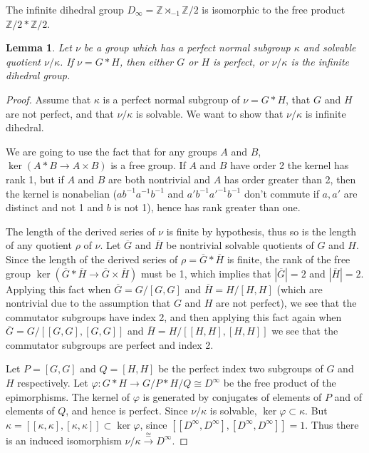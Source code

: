 \documentclass[12pt]{amsart}
\newtheorem{lemma}[theorem]{Lemma}
\theoremstyle{definition}
\newcommand{\Z}{\mathbb Z}
\newcommand{\ol}[1]{{\overline{#1}}}
\begin{document}
The infinite dihedral group $D_\infty = \Z \rtimes_{-1} \Z/2$ is isomorphic to the free product $\Z/2 * \Z/2$.

\begin{lemma}
\label{free product}
Let $\nu$ be a group which has a perfect normal subgroup $\kappa$
and solvable quotient $\nu/\kappa$.
If $\nu ={G*H}$, then either $G$ or $H$ is perfect, or $\nu/\kappa$ is the infinite dihedral group.

\end{lemma}

\begin{proof} Assume that $\kappa$ is a perfect normal subgroup of $\nu = G * H$,  that $G$ and $H$ are not perfect, and that $\nu/\kappa$ is solvable.   We want to show that $\nu/\kappa$ is infinite dihedral.

We are going to use the fact \cite[Proposition 1.4.6]{DD89} that  for any groups $A$ and $B$,  $\ker(A * B \to A \times B)$ is a  free group.   If $A$ and $B$ have order 2  the kernel has rank 1, but if $A$ and $B$ are both nontrivial and $A$ has order greater than 2, then the kernel is nonabelian ($ab^{-1}a^{-1}b^{-1}$ and $a'b^{-1}a'^{-1}b^{-1}$ don't commute if $a,a'$ are distinct and not  1 and $b$ is not  1), hence has rank greater than one.

The length of the derived series of $\nu$ is finite by hypothesis, thus so is the length of any quotient $\rho$ of $\nu$.   Let $\ol G$ and $\ol H$ be nontrivial solvable quotients of $G$ and $H$.    Since the length of the derived series of  $\rho = \ol G *\ol H$ is finite, the rank of the free group  $\ker(\ol G * \ol H \to \ol G \times \ol H)$ must be 1, which implies that  $|\ol G| =2$ and $|\ol H| = 2$.  Applying this fact when $\ol G = G/[G,G]$ and $\ol H = H/[H,H]$ (which are nontrivial due to the assumption that $G$ and $H$ are not perfect), we see that the commutator subgroups have index 2, and then applying this fact again when $\ol G = G/[[G,G],[G,G]]$ and  $\ol H = H/[[H,H],[H,H]]$ we see that the commutator subgroups are perfect and index 2.

Let $P = [G,G]$ and $Q = [H,H]$ be the perfect index two subgroups of $G$ and $H$ respectively.   Let  $\varphi : G * H \to G/P *H/Q \cong D^\infty$ be the free product of the epimorphisms.   The kernel of $\varphi$ is generated by conjugates of elements of $P$ and of elements of $Q$, and hence is perfect.   Since $\nu/\kappa$  is solvable,  $\ker \varphi \subset  \kappa$.  But $\kappa = [[\kappa,\kappa],[\kappa,\kappa]] \subset \ker \varphi$, since $[[D^\infty,D^\infty],[D^\infty,D^\infty]] = 1$.  Thus there is an induced isomorphism $\nu/\kappa \xrightarrow{\cong} D^\infty$.
\end{proof}
\end{document}
